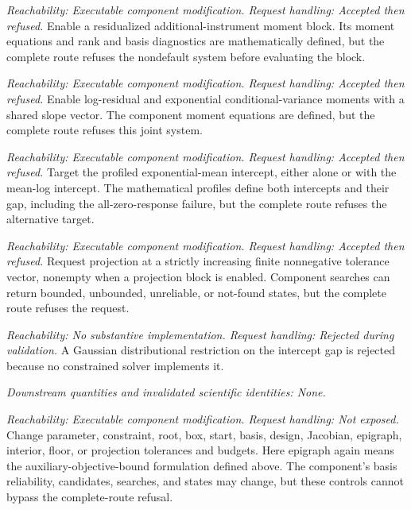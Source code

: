 \documentclass[11pt]{article}
\begin{document}
\begin{description}[style=nextline]
\item[Additional-instrument moment block.]
\emph{Reachability: Executable component modification. Request handling: Accepted then refused.}
Enable a residualized additional-instrument moment block. Its moment equations and rank and basis
diagnostics are mathematically defined, but the complete route refuses the nondefault system before
evaluating the block.

\item[Combined logarithmic and exponential moments.]
\emph{Reachability: Executable component modification. Request handling: Accepted then refused.}
Enable log-residual and exponential conditional-variance moments with a shared slope vector. The
component moment equations are defined, but the complete route refuses this joint system.

\item[Alternative intercept target.]
\emph{Reachability: Executable component modification. Request handling: Accepted then refused.}
Target the profiled exponential-mean intercept, either alone or with the mean-log intercept. The
mathematical profiles define both intercepts and their gap, including the all-zero-response failure, but the
complete route refuses the alternative target.

\item[Tolerance-indexed joint-moment projection.]
\emph{Reachability: Executable component modification. Request handling: Accepted then refused.}
Request projection at a strictly increasing finite nonnegative tolerance vector, nonempty when a
projection block is enabled. Component searches can return bounded, unbounded, unreliable, or
not-found states, but the complete route refuses the request.

\item[Gaussian intercept-gap restriction.]
\emph{Reachability: No substantive implementation. Request handling: Rejected during validation.}
A Gaussian distributional restriction on the intercept gap is rejected because no constrained solver
implements it.

\emph{Downstream quantities and invalidated scientific identities: None.}

\item[Joint-moment component controls.]
\emph{Reachability: Executable component modification. Request handling: Not exposed.}
Change parameter, constraint, root, box, start, basis, design, Jacobian, epigraph, interior, floor, or
projection tolerances and budgets. Here epigraph again means the auxiliary-objective-bound
formulation defined above. The component's basis reliability, candidates, searches, and
states may change, but these controls cannot bypass the complete-route refusal.


\end{description}
\end{document}
